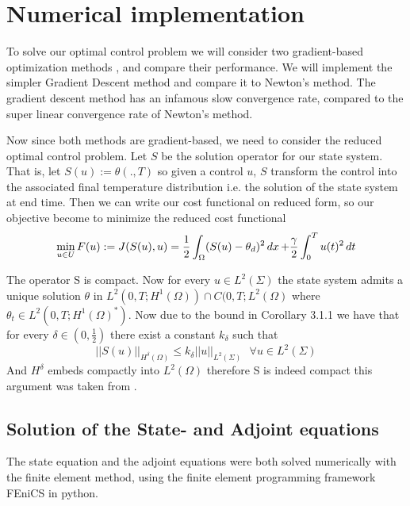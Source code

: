 
\section{Numerical implementation}

To solve our optimal control problem we will consider two gradient-based optimization methods \cite{Algorithms}, and compare their performance. We will implement the simpler Gradient Descent method and compare it to Newton's method. The gradient descent method has an infamous slow convergence rate, compared to the super linear convergence rate of Newton's method.

Now since both methods are gradient-based, we need to consider the reduced optimal control problem. Let $S$ be the solution operator for our state system. That is, let $S(u):=\theta(.,T)$ so given a control $u$, $S$ transform the control into the associated final temperature distribution i.e. the solution of the state system at end time. Then we can write our cost functional on reduced form, so our objective become to minimize the reduced cost functional 
\begin{equation}
\label{eq:optimization_prob}
    \min_{u \in U}F(u) := J(S(u),u) = \frac{1}{2}\int_{\Omega}(S(u) - \theta_d)^2 \mathop{dx}+ \frac{\gamma}{2}\int_0^Tu(t)^2\mathop{dt}
\end{equation}

The operator S is compact. Now for every $u \in L^2(\Sigma)$ the state system admits a unique solution $\theta \text{ in } L^2(0,T;H^1(\Omega)) \cap C(0,T;L^2(\Omega)$ where $\theta_t \in L^2(0,T;H^1(\Omega)^{*})$. Now due to the bound in Corollary 3.1.1 we have that for every $\delta \in (0,\frac{1}{2})$ there exist a constant $k_{\delta}$ such that 
\begin{equation*}
    ||S(u)||_{H^{\delta}(\Omega)} \leq k_{\delta}||u||_{L^2(\Sigma)} \text{ } \forall u \in L^2(\Sigma)
\end{equation*}
And $H^{\delta}$ embeds compactly into $L^2(\Omega)$ therefore S is indeed compact this argument was taken from \cite{primal_dual}. 


\subsection{Solution of the State- and Adjoint equations}

The state equation and the adjoint equations were both solved numerically with the finite element method, using the finite element programming framework FEniCS \cite{fenics} in python.


